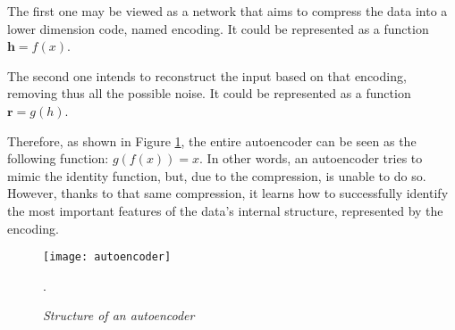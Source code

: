 The first one may be viewed as a network that aims to compress
the data into a  lower dimension code, named encoding.
It could be represented as a function \(\boldsymbol{h}=f(x)\).\cite{deepLearningBook}

The second one intends to reconstruct the input based on that encoding,
removing thus all the possible noise.
It could be represented as a function \(\boldsymbol{r}=g(h)\).\cite{deepLearningBook}


Therefore, as shown in Figure \ref{fig:autoencoder},
the entire autoencoder can be seen as the following function: \(g(f(x))=x\).
In other words, an autoencoder tries to mimic the identity function,
but, due to the compression, is unable to do so.
However, thanks to that same compression,
it learns how to successfully identify
the most important features of the data's internal structure,
represented by the encoding.\cite{deepLearningBook}

\begin{figure}[ht!]
  \centering
  \texttt{[image: autoencoder]}
  \caption{\emph{Structure of an autoencoder \cite{deepLearningBook}}}.
  \label{fig:autoencoder}
  \vspace{100cm}
\end{figure}
